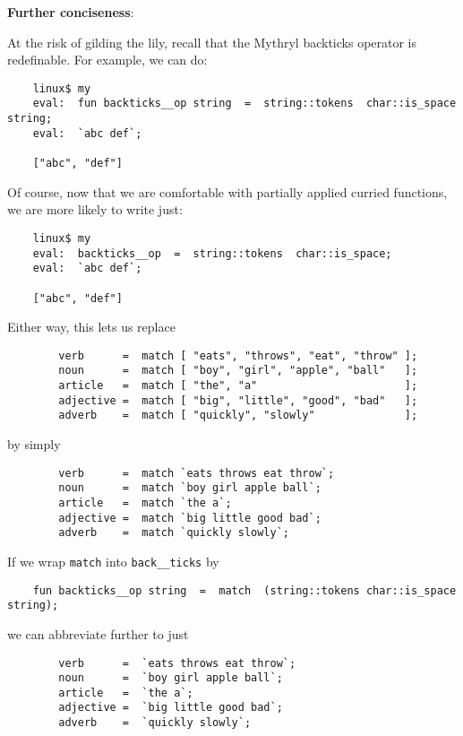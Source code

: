 {\bf Further conciseness}:

At the risk of gilding the lily, recall that the Mythryl backticks 
operator is redefinable.  For example, we can do:

\begin{verbatim}
    linux$ my
    eval:  fun backticks__op string  =  string::tokens  char::is_space  string;
    eval:  `abc def`;

    ["abc", "def"]
\end{verbatim}

Of course, now that we are comfortable with partially applied 
curried functions, we are more likely to write just:

\begin{verbatim}
    linux$ my
    eval:  backticks__op  =  string::tokens  char::is_space;
    eval:  `abc def`;

    ["abc", "def"]
\end{verbatim}

Either way, this lets us replace

\begin{verbatim}
        verb      =  match [ "eats", "throws", "eat", "throw" ];
        noun      =  match [ "boy", "girl", "apple", "ball"   ];
        article   =  match [ "the", "a"                       ];
        adjective =  match [ "big", "little", "good", "bad"   ];
        adverb    =  match [ "quickly", "slowly"              ];
\end{verbatim}

by simply

\begin{verbatim}
        verb      =  match `eats throws eat throw`;
        noun      =  match `boy girl apple ball`;
        article   =  match `the a`;
        adjective =  match `big little good bad`;
        adverb    =  match `quickly slowly`;
\end{verbatim}

If we wrap {\tt match} into {\tt back\_\_ticks} by

\begin{verbatim}
    fun backticks__op string  =  match  (string::tokens char::is_space string);
\end{verbatim}

we can abbreviate further to just

\begin{verbatim}
        verb      =  `eats throws eat throw`;
        noun      =  `boy girl apple ball`;
        article   =  `the a`;
        adjective =  `big little good bad`;
        adverb    =  `quickly slowly`;
\end{verbatim}

